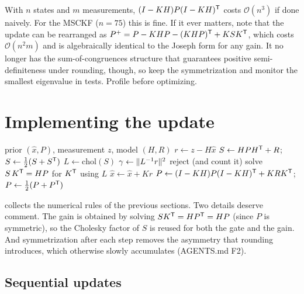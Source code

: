 \begin{implnote}
With $n$ states and $m$ measurements, $(I - KH)P(I-KH)^{\mathsf{T}}$ costs $\mathcal{O}(n^3)$ if done naively. For the MSCKF ($n = 75$) this is fine. If it ever
matters, note that the update can be rearranged as $P^+ = P - KHP - (KHP)^{\mathsf{T}} + K S K^{\mathsf{T}}$, which costs $\mathcal{O}(n^2 m)$ and is algebraically identical to the
Joseph form for any gain. It no longer has the sum-of-congruences structure that guarantees positive semi-definiteness under rounding, though, so
keep the symmetrization and monitor the smallest eigenvalue in tests. Profile before optimizing.
\end{implnote}

\section{Implementing the update}

\begin{algorithm}[t]
\caption{Numerically careful Kalman update}
\label{alg:kf-update}
\begin{algorithmic}[1]
\Require prior $(\hat x, P)$, measurement $z$, model $(H, R)$
\State $r \gets z - H\hat x$ 
\State $S \gets HPH^{\mathsf{T}} + R$; \quad $S \gets \tfrac12(S + S^{\mathsf{T}})$
\State $L \gets \mathrm{chol}(S)$ 
\State $\gamma \gets \|L^{-1} r\|^2$ 
 \State \Return reject (and count it) \EndIf
\State solve $S\,K^{\mathsf{T}} = HP$ for $K^{\mathsf{T}}$ using $L$ 
\State $\hat x \gets \hat x + Kr$
\State $P \gets (I - KH)P(I - KH)^{\mathsf{T}} + KRK^{\mathsf{T}}$; \quad $P \gets \tfrac12(P + P^{\mathsf{T}})$
\end{algorithmic}
\end{algorithm}

 collects the numerical rules of the previous sections. Two details deserve comment. The gain is obtained by solving
$SK^{\mathsf{T}} = HP^{\mathsf{T}} = HP$ (since $P$ is symmetric), so the Cholesky factor of $S$ is reused for both the gate and the gain. And symmetrization after each step
removes the asymmetry that rounding introduces, which otherwise slowly accumulates (AGENTS.md F2).

\subsection{Sequential updates}

